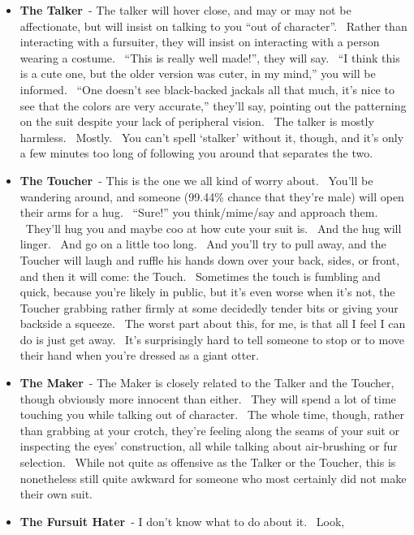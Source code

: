 \begin{itemize}
\tightlist
\item
  \textbf{The Talker}~- The talker will hover close, and may or may not
  be affectionate, but will insist on talking to you ``out of
  character''. ~Rather than interacting with a fursuiter, they will
  insist on interacting with a person wearing a costume. ~``This is
  really well made!'', they will say. ~``I think this is a cute one, but
  the older version was cuter, in my mind,'' you will be informed.
  ~``One doesn't see black-backed jackals all that much, it's nice to
  see that the colors are very accurate,'' they'll say, pointing out the
  patterning on the suit despite your lack of peripheral vision. ~The
  talker is mostly harmless. ~Mostly. ~You can't spell `stalker' without
  it, though, and it's only a few minutes too long of following you
  around that separates the two.
\item
  \textbf{The Toucher}~- This is the one we all kind of worry about.
  ~You'll be wandering around, and someone (99.44\% chance that they're
  male) will open their arms for a hug. ~``Sure!'' you think/mime/say
  and approach them. ~They'll hug you and maybe coo at how cute your
  suit is. ~And the hug will linger. ~And go on a little too long. ~And
  you'll try to pull away, and the Toucher will laugh and ruffle his
  hands down over your back, sides, or front, and then it will come: the
  Touch. ~Sometimes the touch is fumbling and quick, because you're
  likely in public, but it's even worse when it's not, the Toucher
  grabbing rather firmly at some decidedly tender bits or giving your
  backside a squeeze. ~The worst part about this, for me, is that all I
  feel I can do is just get away. ~It's surprisingly hard to tell
  someone to stop or to move their hand when you're dressed as a giant
  otter.
\item
  \textbf{The Maker}~- The Maker is closely related to the Talker and
  the Toucher, though obviously more innocent than either. ~They will
  spend a lot of time touching you while talking out of character. ~The
  whole time, though, rather than grabbing at your crotch, they're
  feeling along the seams of your suit or inspecting the eyes'
  construction, all while talking about air-brushing or fur selection.
  ~While not quite as offensive as the Talker or the Toucher, this is
  nonetheless still quite awkward for someone who most certainly did not
  make their own suit.
\item
  \textbf{The Fursuit Hater}~- I don't know what to do about it. ~Look,

\end{itemize}
